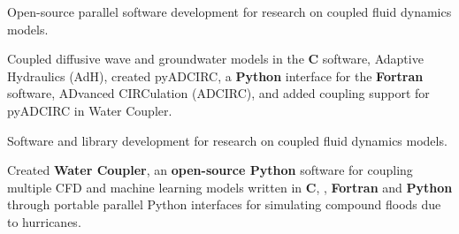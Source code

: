 \documentclass[letterpaper,10pt]{article}
\begin{document}
 
        \resumeItemListStart
            {Open-source parallel software development for research on coupled
            fluid dynamics models.}

            {Coupled diffusive wave and groundwater models in the \textbf{C}
            software, Adaptive Hydraulics (AdH), created pyADCIRC, a
            \textbf{Python} interface for the \textbf{Fortran} software,
            ADvanced CIRCulation (ADCIRC), and added coupling support for
            pyADCIRC in Water Coupler.}
        \resumeItemListEnd

 
        \resumeItemListStart
            {Software and library development for research on coupled
            fluid dynamics models.}

            {Created \textbf{Water Coupler}, an \textbf{open-source Python}
            software for coupling multiple CFD and machine learning models
            written in \textbf{C}, \textbf{\CC{}}, \textbf{Fortran} and
            \textbf{Python} through portable parallel Python interfaces for
            simulating compound floods due to hurricanes.}
       \resumeItemListEnd

% 
%
  \resumeSubHeadingListEnd
\end{document}
